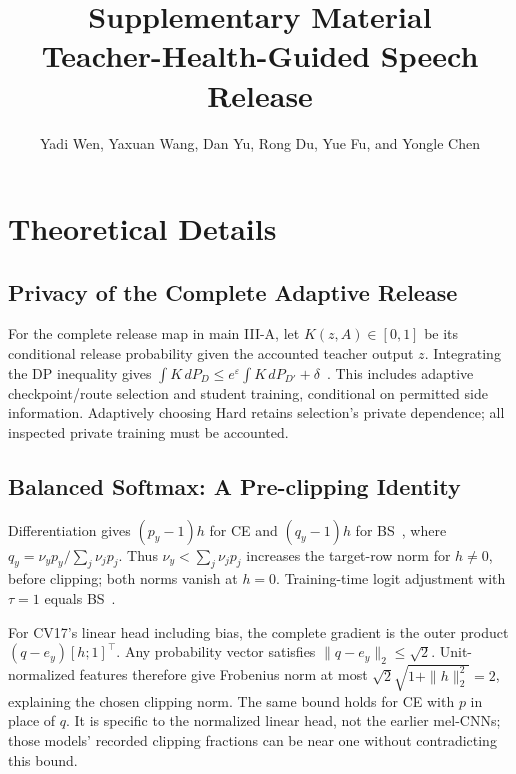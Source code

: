 \documentclass[journal]{IEEEtran}
\begin{document}
\title{Supplementary Material\\Teacher-Health-Guided Speech Release}
\author{Yadi Wen, Yaxuan Wang, Dan Yu, Rong Du, Yue Fu, and Yongle Chen}
\maketitle
\thispagestyle{plain}

\section{Theoretical Details}
\subsection{Privacy of the Complete Adaptive Release}
For the complete release map in main III-A, let $K(z,A)\in[0,1]$ be its conditional release probability given the accounted teacher output $z$. Integrating the DP inequality gives $\int K\,dP_D\le e^\varepsilon\int K\,dP_{D'}+\delta$~\cite{dwork2014}. This includes adaptive checkpoint/route selection and student training, conditional on permitted side information. Adaptively choosing Hard retains selection's private dependence; all inspected private training must be accounted.


\subsection{Balanced Softmax: A Pre-clipping Identity}
Differentiation gives $(p_y-1)h$ for CE and $(q_y-1)h$ for BS~\cite{ren2020balanced}, where $q_y=\nu_yp_y/\sum_j\nu_jp_j$. Thus $\nu_y<\sum_j\nu_jp_j$ increases the target-row norm for $h\ne0$, before clipping; both norms vanish at $h=0$. Training-time logit adjustment with $\tau=1$ equals BS~\cite{menon2021longtail}.

For CV17's linear head including bias, the complete gradient is the outer product $(q-e_y)[h;1]^\top$. Any probability vector satisfies $\|q-e_y\|_2\le\sqrt2$. Unit-normalized features therefore give Frobenius norm at most $\sqrt2\sqrt{1+\|h\|_2^2}=2$, explaining the chosen clipping norm. The same bound holds for CE with $p$ in place of $q$. It is specific to the normalized linear head, not the earlier mel-CNNs; those models' recorded clipping fractions can be near one without contradicting this bound.
\end{document}
